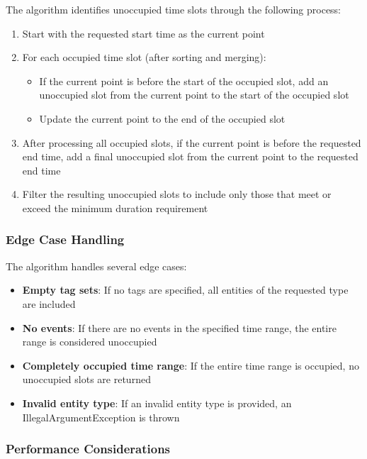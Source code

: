 The algorithm identifies unoccupied time slots through the following process:

\begin{enumerate}
    \item Start with the requested start time as the current point
    \item For each occupied time slot (after sorting and merging):
        \begin{itemize}
            \item If the current point is before the start of the occupied slot, add an unoccupied slot from the current point to the start of the occupied slot
            \item Update the current point to the end of the occupied slot
        \end{itemize}
    \item After processing all occupied slots, if the current point is before the requested end time, add a final unoccupied slot from the current point to the requested end time
    \item Filter the resulting unoccupied slots to include only those that meet or exceed the minimum duration requirement
\end{enumerate}

\subsubsection{Edge Case Handling}

The algorithm handles several edge cases:

\begin{itemize}
    \item \textbf{Empty tag sets}: If no tags are specified, all entities of the requested type are included
    \item \textbf{No events}: If there are no events in the specified time range, the entire range is considered unoccupied
    \item \textbf{Completely occupied time range}: If the entire time range is occupied, no unoccupied slots are returned
    \item \textbf{Invalid entity type}: If an invalid entity type is provided, an IllegalArgumentException is thrown
\end{itemize}

\subsubsection{Performance Considerations}

